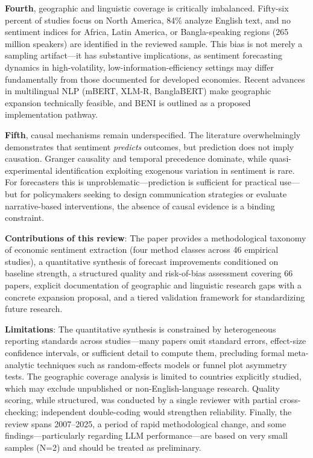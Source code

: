 \documentclass[11pt,twocolumn]{article}
\begin{document}
\textbf{Fourth}, geographic and linguistic coverage is critically imbalanced. Fifty-six percent of studies focus on North America, 84\% analyze English text, and no sentiment indices for Africa, Latin America, or Bangla-speaking regions (265 million speakers) are identified in the reviewed sample. This bias is not merely a sampling artifact---it has substantive implications, as sentiment forecasting dynamics in high-volatility, low-information-efficiency settings may differ fundamentally from those documented for developed economies. Recent advances in multilingual NLP (mBERT, XLM-R, BanglaBERT) make geographic expansion technically feasible, and BENI is outlined as a proposed implementation pathway.

\textbf{Fifth}, causal mechanisms remain underspecified. The literature overwhelmingly demonstrates that sentiment \emph{predicts} outcomes, but prediction does not imply causation. Granger causality and temporal precedence dominate, while quasi-experimental identification exploiting exogenous variation in sentiment is rare. For forecasters this is unproblematic---prediction is sufficient for practical use---but for policymakers seeking to design communication strategies or evaluate narrative-based interventions, the absence of causal evidence is a binding constraint.

\textbf{Contributions of this review}: The paper provides a methodological taxonomy of economic sentiment extraction (four method classes across 46 empirical studies), a quantitative synthesis of forecast improvements conditioned on baseline strength, a structured quality and risk-of-bias assessment covering 66 papers, explicit documentation of geographic and linguistic research gaps with a concrete expansion proposal, and a tiered validation framework for standardizing future research.

\textbf{Limitations}: The quantitative synthesis is constrained by heterogeneous reporting standards across studies---many papers omit standard errors, effect-size confidence intervals, or sufficient detail to compute them, precluding formal meta-analytic techniques such as random-effects models or funnel plot asymmetry tests. The geographic coverage analysis is limited to countries explicitly studied, which may exclude unpublished or non-English-language research. Quality scoring, while structured, was conducted by a single reviewer with partial cross-checking; independent double-coding would strengthen reliability. Finally, the review spans 2007--2025, a period of rapid methodological change, and some findings---particularly regarding LLM performance---are based on very small samples (N=2) and should be treated as preliminary.
\end{document}
